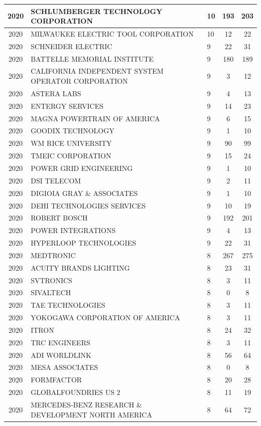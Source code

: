 \documentclass{article}%
\begin{document}
\begin{longtable}{c|p{20em}|p{5em}|c|c}
2020&SCHLUMBERGER TECHNOLOGY CORPORATION&10&193&203\\%
\hline%
2020&MILWAUKEE ELECTRIC TOOL CORPORATION&10&12&22\\%
\hline%
2020&SCHNEIDER ELECTRIC&9&22&31\\%
\hline%
2020&BATTELLE MEMORIAL INSTITUTE&9&180&189\\%
\hline%
2020&CALIFORNIA INDEPENDENT SYSTEM OPERATOR CORPORATION&9&3&12\\%
\hline%
2020&ASTERA LABS&9&4&13\\%
\hline%
2020&ENTERGY SERVICES&9&14&23\\%
\hline%
2020&MAGNA POWERTRAIN OF AMERICA&9&6&15\\%
\hline%
2020&GOODIX TECHNOLOGY&9&1&10\\%
\hline%
2020&WM RICE UNIVERSITY&9&90&99\\%
\hline%
2020&TMEIC CORPORATION&9&15&24\\%
\hline%
2020&POWER GRID ENGINEERING&9&1&10\\%
\hline%
2020&DSI TELECOM&9&2&11\\%
\hline%
2020&DIGIOIA GRAY \& ASSOCIATES&9&1&10\\%
\hline%
2020&DEHI TECHNOLOGIES SERVICES&9&10&19\\%
\hline%
2020&ROBERT BOSCH&9&192&201\\%
\hline%
2020&POWER INTEGRATIONS&9&4&13\\%
\hline%
2020&HYPERLOOP TECHNOLOGIES&9&22&31\\%
\hline%
2020&MEDTRONIC&8&267&275\\%
\hline%
2020&ACUITY BRANDS LIGHTING&8&23&31\\%
\hline%
2020&SVTRONICS&8&3&11\\%
\hline%
2020&SIVALTECH&8&0&8\\%
\hline%
2020&TAE TECHNOLOGIES&8&3&11\\%
\hline%
2020&YOKOGAWA CORPORATION OF AMERICA&8&3&11\\%
\hline%
2020&ITRON&8&24&32\\%
\hline%
2020&TRC ENGINEERS&8&3&11\\%
\hline%
2020&ADI WORLDLINK&8&56&64\\%
\hline%
2020&MESA ASSOCIATES&8&0&8\\%
\hline%
2020&FORMFACTOR&8&20&28\\%
\hline%
2020&GLOBALFOUNDRIES US 2&8&11&19\\%
\hline%
2020&MERCEDES{-}BENZ RESEARCH \& DEVELOPMENT NORTH AMERICA&8&64&72\\%

\end{longtable}
\end{document}
